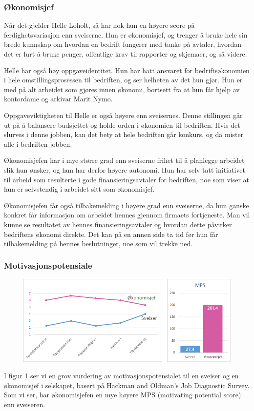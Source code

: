 \subsubsection{Økonomisjef}
Når det gjelder Helle Loholt, så har nok hun en høyere score på ferdighetsvariasjon enn sveiserne. Hun er økonomisjef, og trenger å bruke hele sin brede kunnskap om hvordan en bedrift fungerer med tanke på avtaler, hvordan det er lurt å bruke penger, offentlige krav til rapporter og skjemaer, og så videre.

Helle har også høy oppgaveidentitet. Hun har hatt ansvaret for bedriftsøkonomien i hele omstillingsprosessen til bedriften, og ser helheten av det hun gjør. Hun er med på alt arbeidet som gjøres innen økonomi, bortsett fra at hun får hjelp av kontordame og arkivar Marit Nymo.

Oppgaveviktigheten til Helle er også høyere enn sveisernes. Denne stillingen går ut på å balansere budsjettet og holde orden i økonomien til bedriften. Hvis det slurves i denne jobben, kan det bety at hele bedriften går konkurs, og da mister alle i bedriften jobben.

Økonomisjefen har i mye større grad enn sveiserne frihet til å planlegge arbeidet slik hun ønsker, og hun har derfor høyere autonomi. Hun har selv tatt initiativet til arbeid som resulterte i gode finansieringsavtaler for bedriften, noe som viser at hun er selvstendig i arbeidet sitt som økonomisjef.

Økonomisjefen får også tilbakemelding i høyere grad enn sveiserne, da hun ganske konkret får informasjon om arbeidet hennes gjennom firmaets fortjeneste. Man vil kunne se resultatet av hennes finansieringsavtaler og hvordan dette påvirker bedriftens økonomi direkte. Det kan på en annen side ta tid før hun får tilbakemelding på hennes beslutninger, noe som vil trekke ned.

\subsubsection{Motivasjonspotensiale}
\begin{figure}[ht!]
    \centering
    \includegraphics[width=135mm]{mps.png}
    \label{fig:mps}
\end{figure}
I figur \ref{fig:mps} ser vi en grov vurdering av motivasjonspotensialet til en sveiser og en økonomisjef i selskapet, basert på Hackman and Oldman’s Job Diagnostic Survey. Som vi ser, har økonomisjefen en mye høyere MPS (motivating potential score) enn sveiseren. 

